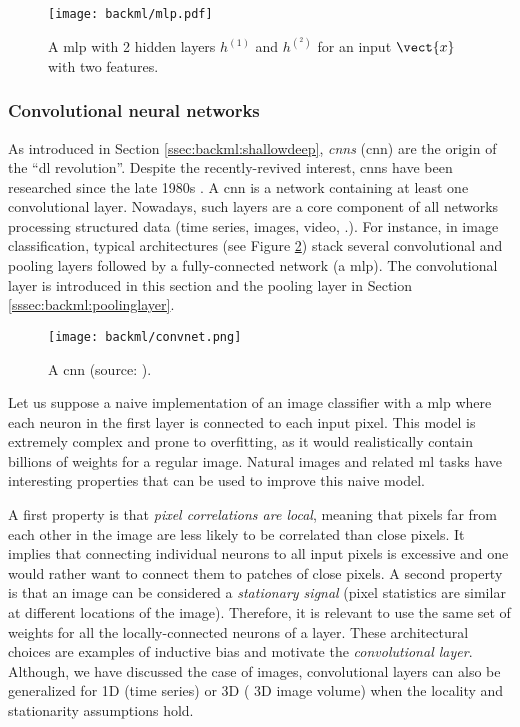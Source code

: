 \begin{figure}
  \centering
  \texttt{[image: backml/mlp.pdf]}
  \caption{A \acrlong{mlp} with 2 hidden layers $h^{(1)}$ and $h^{(^2)}$ for an input $\vect{x}$ with two features.}
  \label{fig:backml:mlp}
\end{figure}

\subsubsection{Convolutional neural networks}
\label{sssec:backml:dl:cnn}

As introduced in Section \ref{ssec:backml:shallowdeep}, \textit{\acrlong{cnn}s}
(\acrshort{cnn}) are the origin of the ``\acrlong{dl} revolution''. Despite the
recently-revived interest, \acrshort{cnn}s have been researched since the late
1980s \cite{lecun1989handwritten}. A \acrshort{cnn} is a network containing
at least one convolutional layer. Nowadays, such layers are a core component of
all networks processing structured data (time series, images, video, \etc.). For
instance, in image classification, typical architectures (see Figure \ref{fig:backml:cnn})
stack several convolutional and pooling layers followed by a fully-connected
network (\ie a \acrshort{mlp}). The convolutional layer is introduced in this
section and the pooling layer in Section \ref{sssec:backml:poolinglayer}.

\begin{figure}
  \centering
  \texttt{[image: backml/convnet.png]}
  \caption{A \acrlong{cnn} (source: \cite{millar2019using}).}
  \label{fig:backml:cnn}
\end{figure}

Let us suppose a naive implementation of an image classifier with a \acrshort{mlp}
where each neuron in the first layer is connected to each input pixel. This model
is extremely complex and prone to overfitting, as it would realistically contain
billions of weights for a regular image. Natural images and related \acrlong{ml}
tasks have interesting properties that can be used to improve this naive model.

A first property is that \textit{pixel correlations are local}, meaning that pixels
far from each other in the image are less likely to be correlated than close
pixels. It implies that connecting individual neurons to all input pixels is
excessive and one would rather want to connect them to patches of close pixels.
A second property is that an image can be considered a \textit{stationary signal}
(\ie pixel statistics are similar at different locations of the image). Therefore,
it is relevant to use the same set of weights for all the locally-connected neurons
of a layer. These architectural choices are examples of inductive bias and motivate
the \textit{convolutional layer}. Although, we have discussed the case of images,
convolutional layers can also be generalized for 1D (\eg time series) or 3D (\eg
3D image volume) when the locality and stationarity assumptions hold.

